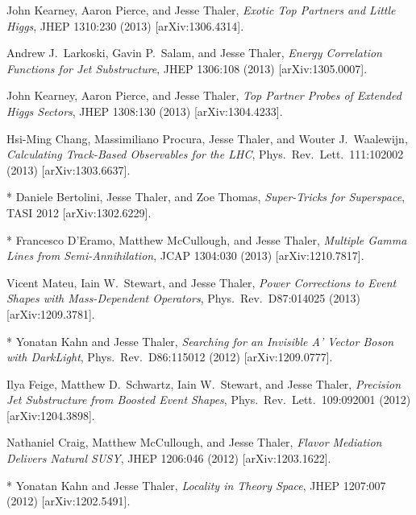 \begin{list}{[]\addtocounter{jessecount}{-1}}{\leftmargin=3em \itemsep=4pt}
\item
 John Kearney, Aaron Pierce, and Jesse Thaler,
\emph{Exotic Top Partners and Little Higgs},
JHEP 1310:230 (2013)
[arXiv:1306.4314].

\item
 Andrew J.\ Larkoski, Gavin P.\ Salam, and Jesse Thaler,
\emph{Energy Correlation Functions for Jet Substructure},
JHEP 1306:108 (2013)
[arXiv:1305.0007].

\item
 John Kearney, Aaron Pierce, and Jesse Thaler,
\emph{Top Partner Probes of Extended Higgs Sectors},
JHEP 1308:130 (2013)
[arXiv:1304.4233].

\item
 Hsi-Ming Chang, Massimiliano Procura, Jesse Thaler, and Wouter J.\ Waalewijn,
\emph{Calculating Track-Based Observables for the LHC},
Phys.\ Rev.\ Lett.\ 111:102002 (2013)
[arXiv:1303.6637].

\item
* Daniele Bertolini, Jesse Thaler, and Zoe Thomas,
\emph{Super-Tricks for Superspace},
TASI 2012
[arXiv:1302.6229].

\item
* Francesco D'Eramo, Matthew McCullough, and Jesse Thaler,
\emph{Multiple Gamma Lines from Semi-Annihilation},
JCAP 1304:030 (2013)
[arXiv:1210.7817].

\item
 Vicent Mateu, Iain W.\ Stewart, and Jesse Thaler,
\emph{Power Corrections to Event Shapes with Mass-Dependent Operators},
Phys.\ Rev.\ D87:014025 (2013)
[arXiv:1209.3781].

\item
* Yonatan Kahn and Jesse Thaler,
\emph{Searching for an Invisible A' Vector Boson with DarkLight},
Phys.\ Rev.\ D86:115012 (2012)
[arXiv:1209.0777].

\item
 Ilya Feige, Matthew D.\ Schwartz, Iain W.\ Stewart, and Jesse Thaler,
\emph{Precision Jet Substructure from Boosted Event Shapes},
Phys.\ Rev.\ Lett.\ 109:092001 (2012)
[arXiv:1204.3898].

\item
 Nathaniel Craig, Matthew McCullough, and Jesse Thaler,
\emph{Flavor Mediation Delivers Natural SUSY},
JHEP 1206:046 (2012)
[arXiv:1203.1622].

\item
* Yonatan Kahn and Jesse Thaler,
\emph{Locality in Theory Space},
JHEP 1207:007 (2012)
[arXiv:1202.5491].


\end{list}
